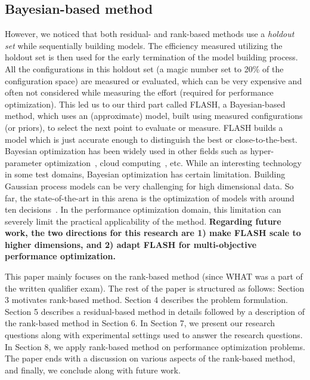\documentclass[sigconf]{acmart}
\begin{document}
\subsection{Bayesian-based method}
However, we noticed that both residual- and rank-based methods use a \textit{holdout set} while
sequentially building models. The efficiency measured utilizing the holdout set is then used
for the early termination of the model building process. All the configurations in this holdout set (a magic number set to 20\% of the configuration space) are measured or evaluated, which can be very expensive and often not considered while measuring the effort (required for performance optimization). This led us to our third part called FLASH, a Bayesian-based method, which uses an (approximate) model, built using measured configurations (or priors), to select
the next point to evaluate or measure. FLASH builds a model which is just accurate enough to distinguish the best or close-to-the-best.  Bayesian optimization has been widely used in other fields such as hyper-parameter optimization~\cite{snoek2012practical}, cloud computing~\cite{alipourfard2017cherrypick}, etc. While an interesting technology in some test domains,
Bayesian optimization has certain limitation. Building Gaussian
process models can be very challenging for high dimensional
data. So far, the state-of-the-art in this arena is
the optimization of models with around ten decisions~\cite{wang2016bayesian}.
In the performance optimization domain, this limitation can
severely limit the practical applicability of the method. 
\textbf{Regarding future work, the two directions for this research
are 1) make FLASH scale to higher dimensions, and 2) adapt FLASH for multi-objective performance optimization. }

This paper mainly focuses on the rank-based method (since WHAT was a part of the written qualifier exam). The rest of the paper is structured as follows: Section 3 motivates rank-based method. Section 4 describes the problem formulation. Section 5 describes a residual-based method in details followed by a description of the rank-based method in Section 6. In Section 7, we present our research questions along with experimental settings used to answer the research questions. In Section 8, we apply rank-based method on performance optimization problems. The paper ends with a discussion on various aspects of the rank-based method, and finally, we conclude along with future work.
\end{document}
